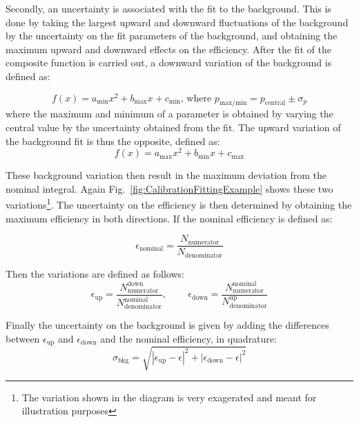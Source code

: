 Secondly, an uncertainty is associated with the fit to the background. This is done by taking the largest upward and downward fluctuations of the background by the uncertainty on the fit parameters of the background, and obtaining the maximum upward and downward effects on the efficiency. 
After the fit of the composite function is carried out, a downward variation of the background is defined as:

\begin{equation*}
  f(x) = a_{\textrm{min}}x^{2} + b_{\textrm{max}}x + c_{\textrm{min}}\textrm{, where }p_{\textrm{max/min}}=p_{\textrm{central}}\pm\sigma_{p}
\end{equation*}
%
where the maximum and minimum of a parameter is obtained by varying the central value by the uncertainty obtained from the fit. The upward variation of the background fit is thus the opposite, defined as:
%
\begin{equation*}
  f(x) = a_{\textrm{max}}x^{2} + b_{\textrm{min}}x + c_{\textrm{max}}
\end{equation*}

These background variation then result in the maximum deviation from the nominal integral. Again Fig.~\ref{fig:CalibrationFittingExample} shows these two variations\footnote{The variation shown in the diagram is very exagerated and meant for illustration purposes}. The uncertainty on the efficiency is then determined by obtaining the maximum efficiency in both directions. If the nominal efficiency is defined as:

\begin{equation*}
  \epsilon_{\textrm{nominal}} = \frac{N_{\textrm{numerator}}}{N_{\textrm{denominator}}}
\end{equation*}

Then the variations are defined as follows:
%
\begin{equation*}
  \epsilon_{\textrm{up}} = \frac{N^{\textrm{down}}_{\textrm{numerator}}}{N^{\textrm{nominal}}_{\textrm{denominator}}}\textrm{, }\qquad
  \epsilon_{\textrm{down}} = \frac{N^{\textrm{nominal}}_{\textrm{numerator}}}{N^{\textrm{up}}_{\textrm{denominator}}}
\end{equation*}

Finally the uncertainty on the background is given by adding the differences between $\epsilon_{\textrm{up}}$ and $\epsilon_{\textrm{down}}$ and the nominal efficiency, in quadrature:
%
\begin{equation*}
  \sigma_{\textrm{bkg}} = \sqrt{|\epsilon_{\textrm{up}}-\epsilon|^{2}+|\epsilon_{\textrm{down}}-\epsilon|^{2}}
\end{equation*}

